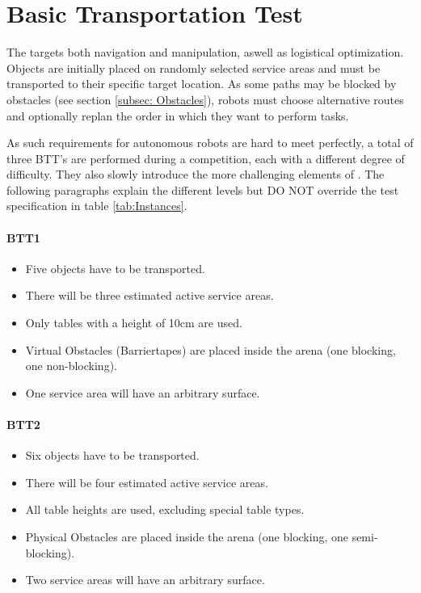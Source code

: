 \newpage
\section{Basic Transportation Test}
\label{sec:Basic Transportation Test}

The  targets both navigation and manipulation, aswell as logistical optimization. Objects are initially placed on randomly selected service areas and must be transported to their specific target location. As some paths may be blocked by obstacles (see section \ref{subsec: Obstacles}), robots must choose alternative routes and optionally replan the order in which they want to perform tasks.

As such requirements for autonomous robots are hard to meet perfectly,
a total of three BTT's are performed during a competition, each with a different degree of difficulty.
They also slowly introduce the more challenging elements of \RCAW .
The following paragraphs explain the different levels but DO NOT override the test specification in table \ref{tab:Instances}.

\paragraph{BTT1}
\begin{itemize}
\item Five objects have to be transported.
\item There will be three estimated active service areas.
\item Only tables with a height of 10cm are used. 
\item Virtual Obstacles (Barriertapes) are placed inside the arena (one blocking, one non-blocking).
\item One service area will have an arbitrary surface.
\end{itemize}

\paragraph{BTT2}
\begin{itemize}
\item Six objects have to be transported.
\item There will be four estimated active service areas.
\item All table heights are used, excluding special table types.
\item Physical Obstacles are placed inside the arena (one blocking, one semi-blocking).
\item Two service areas will have an arbitrary surface.
\end{itemize}

